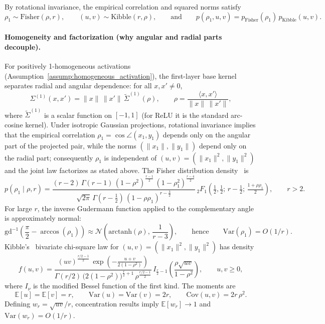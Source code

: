\begin{remark}\label{rmk:fisher-kibble-law}
By rotational invariance, the empirical correlation and squared norms satisfy
\[
\rho_1 \sim \mathrm{Fisher}(\rho,r),\qquad (u,v) \sim \mathrm{Kibble}(r,\rho),
\qquad\text{and}\qquad p(\rho_1,u,v)=p_{\mathrm{Fisher}}(\rho_1)\,p_{\mathrm{Kibble}}(u,v).
\]
\paragraph{Homogeneity and factorization (why angular and radial parts decouple).}\label{appendix:homogeneity-decoupling}
For positively 1-homogeneous activations (Assumption~\ref{assump:homogeneous_activation}), the first-layer base kernel separates radial and angular dependence: for all \(x,x'\neq 0\),
\[
\Sigma^{(1)}(x,x')=\|x\|\,\|x'\|\,\tilde{\Sigma}^{(1)}(\rho),\qquad \rho=\frac{\langle x,x'\rangle}{\|x\|\,\|x'\|},
\]
where \(\tilde{\Sigma}^{(1)}\) is a scalar function on \([-1,1]\) (for ReLU it is the standard arc-cosine kernel). Under isotropic Gaussian projections, rotational invariance implies that the empirical correlation \(\rho_1=\cos\angle(x_1,y_1)\) depends only on the angular part of the projected pair, while the norms \((\|x_1\|,\|y_1\|)\) depend only on the radial part; consequently \(\rho_1\) is independent of \((u,v)=(\|x_1\|^2,\|y_1\|^2)\) and the joint law factorizes as stated above.
The Fisher distribution density~\cite{fisher1915probable} is
\[
p(\rho_1 \mid \rho, r)
=
\frac{(r-2)\,\Gamma(r-1)\,(1-\rho^2)^{\frac{r-1}{2}}\,(1-\rho_1^2)^{\frac{r-4}{2}}}{\sqrt{2\pi}\,\Gamma(r-\tfrac{1}{2})\,(1-\rho\rho_1)^{r-\frac{3}{2}}}\,
{}_2F_1\!\left(\tfrac{1}{2},\tfrac{1}{2};\, r-\tfrac{1}{2};\, \tfrac{1+\rho\rho_1}{2}\right),
\qquad r>2.
\]
\medskip
\noindent
For large \(r\), the inverse Gudermann function applied to the complementary angle is approximately normal:
\[
\mathrm{gd}^{-1}\!\left(\frac{\pi}{2}-\arccos(\rho_1)\right)
\approx
\mathcal{N}\!\left(\mathrm{arctanh}(\rho),\,\frac{1}{r-3}\right),
\qquad\text{hence}\qquad \mathrm{Var}(\rho_1)=O(1/r).
\]
\medskip
\noindent
Kibble's~\cite{kibble1941two} bivariate chi-square law for \((u,v)=(\|x_1\|^2,\|y_1\|^2)\) has density
\[
f(u,v)
=
\frac{(uv)^{\frac{r/2-1}{2}}\,\exp\!\left(-\tfrac{u+v}{2(1-\rho^2)}\right)}{\Gamma(r/2)\,\big(2(1-\rho^2)\big)^{\frac{r}{2}+1}\,\rho^{\frac{r/2-1}{2}}}\,
I_{\frac{r}{2}-1}\!\left(\frac{\rho\sqrt{uv}}{1-\rho^2}\right),
\qquad u,v\ge 0,
\]
where \(I_\nu\) is the modified Bessel function of the first kind. The moments are
\[
\mathbb{E}[u]=\mathbb{E}[v]=r,\qquad \mathrm{Var}(u)=\mathrm{Var}(v)=2r,\qquad \mathrm{Cov}(u,v)=2r\,\rho^2.
\]
Defining \(w_r=\sqrt{uv}/r\), concentration results imply \(\mathbb{E}[w_r]\to 1\) and \(\mathrm{Var}(w_r)=O(1/r)\).


\end{remark}
